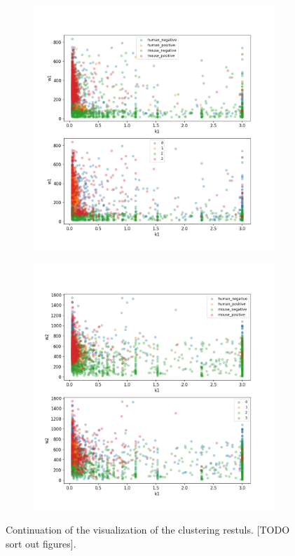 \begin{figure}
\begin{subfigure}{0.45\textwidth}
	\end{subfigure}
	\hfill
	\begin{subfigure}{0.45\textwidth}
		\includegraphics[width=\textwidth]{fig/seperate_k1_w1}
	\end{subfigure}
	\hfill
	\begin{subfigure}{0.45\textwidth}
		\includegraphics[width=\textwidth]{fig/seperate_k1_w2}
	\end{subfigure}
	\caption{Continuation of the visualization of the clustering restuls. [TODO sort out figures].}
\label{fig:vis_output_seperate3}
\end{figure}

